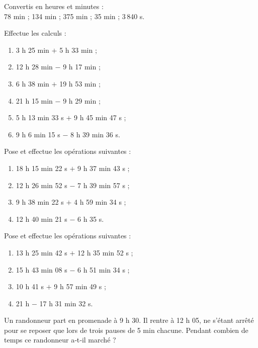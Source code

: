 



\begin{exercice}
Convertis en heures et minutes :\\
78 min ; 134 min ; 375 min ; 35 min ; 3\,840 s.
\end{exercice}


\begin{exercice}
Effectue les calculs :
\begin{enumerate} 
 \item 3 h 25 min $+$ 5 h 33 min ;
 \item 12 h 28 min $-$ 9 h 17 min ;
 \item 6 h 38 min $+$ 19 h 53 min ;
 \item 21 h 15 min $-$ 9 h 29 min ;
 \item 5 h 13 min 33 s $+$ 9 h 45 min 47 s ;
 \item 9 h 6 min 15 s $-$ 8 h 39 min 36 s.
 \end{enumerate}
\end{exercice}


\begin{exercice}
Pose et effectue les opérations suivantes :
\begin{enumerate} 
 \item 18 h 15 min 22 s $+$ 9 h 37 min 43 s ;
 \item 12 h 26 min 52 s $-$ 7 h 39 min 57 s ;
 \item 9 h 38 min 22 s $+$ 4 h 59 min 34 s ;
 \item 12 h 40 min 21 s $-$ 6 h 35 s.
 \end{enumerate}
\end{exercice}


\begin{exercice}
Pose et effectue les opérations suivantes :
\begin{enumerate} 
 \item 13 h 25 min 42 s $+$ 12 h 35 min 52 s ;
 \item 15 h 43 min 08 s $-$ 6 h 51 min 34 s ;
 \item 10 h 41 s $+$ 9 h 57 min 49 s ;
 \item 21 h $-$ 17 h 31 min 32 s.
 \end{enumerate}
\end{exercice}


\begin{exercice}
Un randonneur part en promenade à 9 h 30. Il rentre à 12 h 05, ne s'étant arrêté pour se reposer que lors de trois pauses de 5 min chacune. Pendant combien de temps ce randonneur a‑t‑il marché ?
\end{exercice}


